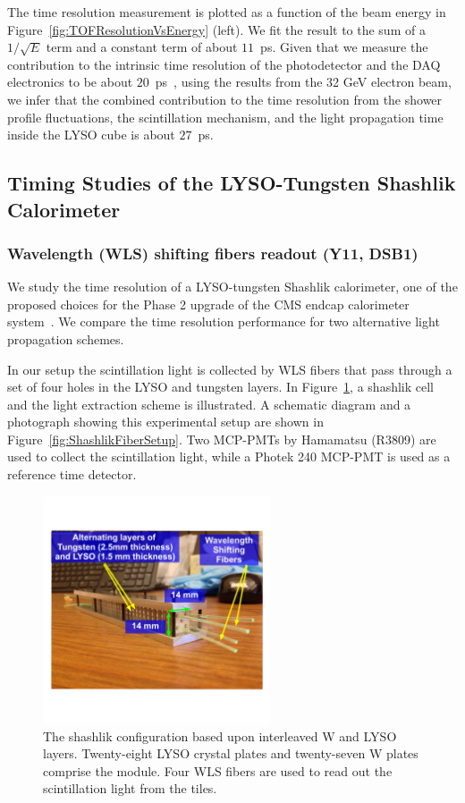 \documentclass[12pt]{article}
\begin{document}
The time resolution measurement is plotted as a function of the
beam energy in Figure~\ref{fig:TOFResolutionVsEnergy} (left). We fit the result to the sum of a 
$1/\sqrt{E}$ term and a constant term of about $11$~ps.   Given that we measure the contribution to the intrinsic time resolution of the
photodetector and the DAQ electronics to be about $20$~ps~\cite{MCPFastCaloNIMA}, using the results from
the 32 GeV electron beam, we infer that the combined contribution to the time resolution from the shower profile
fluctuations, the scintillation mechanism, and the light propagation time inside the
LYSO cube is about $27$~ps.  

\subsection{Timing Studies of the LYSO-Tungsten Shashlik Calorimeter}
\subsubsection{Wavelength (WLS) shifting fibers readout (Y11, DSB1)}
We study the time resolution of a LYSO-tungsten Shashlik calorimeter, one of the
proposed choices for the Phase 2 upgrade of the CMS endcap calorimeter
system~\cite{Contardo:1605208}. We compare the time resolution performance for
two alternative light propagation schemes. 

In our setup the scintillation light is collected by WLS fibers that
pass through a set of four holes in the LYSO and tungsten layers. In 
Figure~\ref{fig:ShashlikDiagram}, a shashlik cell and the light extraction 
scheme is illustrated. A schematic diagram and a photograph showing this experimental
setup are shown in Figure~\ref{fig:ShashlikFiberSetup}. Two MCP-PMTs  by 
Hamamatsu (R3809) are used to collect the scintillation light, while a Photek 240 
MCP-PMT is used as a reference time detector. 

\begin{figure}[H] \centering
\includegraphics[width=0.6\textwidth]{figs/ShashlikCellPhoto.pdf} 
\caption{\small The shashlik configuration based upon interleaved W and LYSO layers. 
Twenty-eight LYSO crystal plates and twenty-seven W plates comprise the module.
Four WLS fibers are used to read out the scintillation light from the 
tiles. } 
\label{fig:ShashlikDiagram}
\end{figure}
\end{document}
